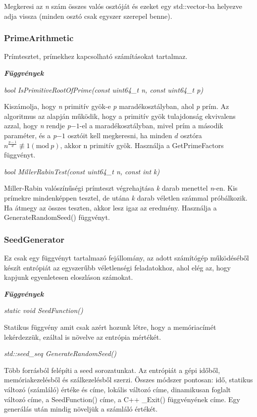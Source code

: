 \documentclass[12pt]{article}
\begin{document}
Megkeresi az \textit{n} szám összes valós osztóját és ezeket egy std::vector-ba helyezve adja vissza (minden osztó csak egyszer szerepel benne).

\subsubsection*{PrimeArithmetic}

Prímtesztet, prímekhez kapcsolható számításokat tartalmaz.

\textit{\textbf{Függvények}}

\textit{bool IsPrimitiveRootOfPrime(const uint64\_t n, const uint64\_t p)}

Kiszámolja, hogy \textit{n} primitív gyök-e \textit{p} maradékosztályban, ahol \textit{p} prím. Az algoritmus az alapján működik, hogy a primitív gyök tulajdonság ekvivalens azzal, hogy \textit{n} rendje \textit{p}$-1$-el a maradékosztályban, mivel prím a második paraméter, és a \textit{p}$-1$ osztóit kell megkeresni, ha minden $d$ osztóra $n^\frac{\textit{p}-1}{d} \not\equiv 1 (\textrm{mod}\ p)$, akkor n primitív gyök. Használja a GetPrimeFactors függvényt.

\textit{bool MillerRabinTest(const uint64\_t n, const int k)}

Miller-Rabin valószínűségi prímteszt végrehajtása \textit{k} darab menettel \textit{n}-en. Kis prímekre mindenképpen tesztel, de utána \textit{k} darab véletlen számmal próbálkozik. Ha átmegy az összes teszten, akkor lesz igaz az eredmény. Használja a GenerateRandomSeed() függvényt.

\subsubsection*{SeedGenerator}

Ez csak egy függvényt tartalmazó fejállomány, az adott számítógép működéséből készít entrópiát az egyszerűbb véletlenségi feladatokhoz, ahol elég az, hogy kapjunk egyenletesen eloszláson számokat.

\textit{\textbf{Függvények}}

\textit{static void SeedFunction()}

Statikus függvény amit csak azért hozunk létre, hogy a memóriacímét lekérdezzük, ezáltal is növelve az entrópia mértékét.

\textit{std::seed\_seq GenerateRandomSeed()}

Több forrásból felépíti a seed sorozatunkat. Az entrópiát a gépi időből, memóriakezelésből és szálkezelésből szerzi. Összes módszer pontosan: idő, statikus változó (számláló) értéke és címe, lokális változó címe, dinamikusan foglalt változó címe, a SeedFunction() címe, a C++ \_Exit() függvényének címe. Egy generálás után mindig növeljük a számláló értékét.
\end{document}

